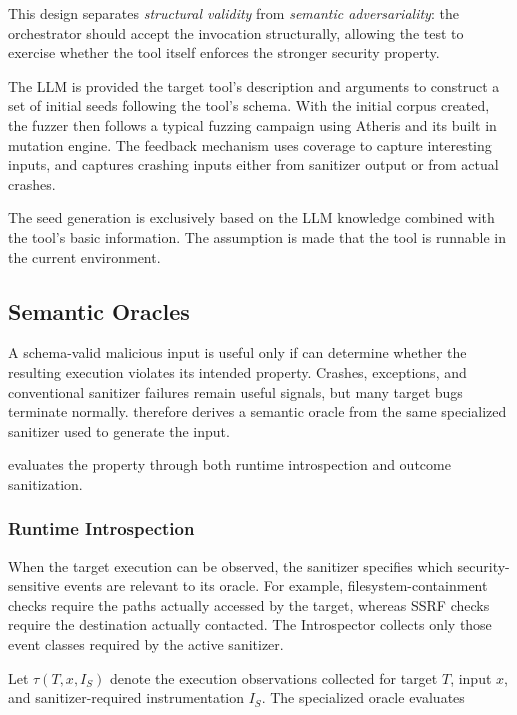 This design separates \emph{structural validity} from \emph{semantic
adversariality}: the orchestrator should accept the invocation structurally,
allowing the test to exercise whether the tool itself enforces the stronger
security property.

The LLM is provided the target tool's description and arguments to construct a set of initial seeds following the tool's schema. With the initial corpus created, the fuzzer then follows a typical fuzzing campaign using Atheris and its built in mutation engine. The feedback mechanism uses coverage to capture interesting inputs, and captures crashing inputs either from sanitizer output or from actual crashes.

The seed generation is exclusively based on the LLM knowledge combined with the tool's basic information. The assumption is made that the tool is runnable in the current environment. 

\subsection{Semantic Oracles}
\label{sec:design-oracles}

A schema-valid malicious input is useful only if \project{} can determine
whether the resulting execution violates its intended property. Crashes,
exceptions, and conventional sanitizer failures remain useful signals, but
many target bugs terminate normally. \project{} therefore derives a semantic
oracle from the same specialized sanitizer used to generate the input.

\project{} evaluates the property through both runtime introspection and outcome sanitization.

\subsubsection{Runtime Introspection}
\label{sec:design-introspection}

When the target execution can be observed, the sanitizer specifies which
security-sensitive events are relevant to its oracle. For example,
filesystem-containment checks require the paths actually accessed by the
target, whereas SSRF checks require the destination actually contacted. The
Introspector collects only those event classes required by the active
sanitizer.

Let $\tau(T,x,I_S)$ denote the execution observations collected for target
$T$, input $x$, and sanitizer-required instrumentation $I_S$. The specialized
oracle evaluates

